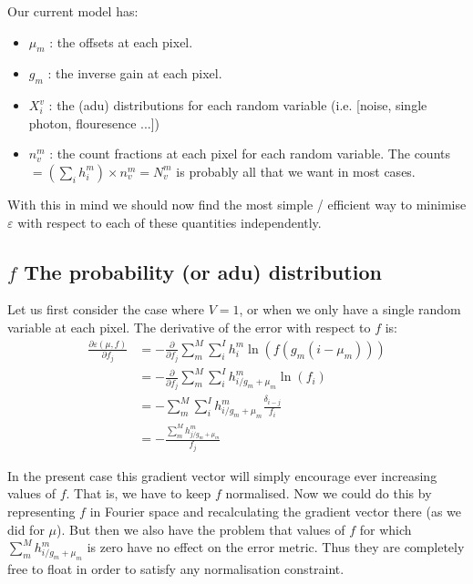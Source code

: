 \documentclass[11pt]{article}
\begin{document}
Our current model has:
\begin{itemize}
  \item $\mu_m$ : the offsets at each pixel.
  \item $g_m$   : the inverse gain at each pixel.
  \item $X^v_i$ : the (adu) distributions for each random variable (i.e. [noise, single photon, flouresence ...])
  \item $n^m_v$ : the count fractions at each pixel for each random variable. The counts $= (\sum_i h^m_i) \times n^m_v = N^m_v$ is probably all that we want in most cases.
\end{itemize}

With this in mind we should now find the most simple / efficient way to minimise $\varepsilon$ with respect to each of these quantities independently. 















\subsection{$f$ The probability (or adu) distribution}
Let us first consider the case where $V=1$, or when we only have a single random variable at each pixel. The derivative of the error with respect to $f$ is:
\begin{align}
   \frac{\partial \varepsilon(\mu, f)}{\partial f_j} &= -\frac{\partial}{\partial f_j} \sum_m^M \sum_i^I h^m_i \ln(f(g_m(i - \mu_m))) \\
   &= -\frac{\partial}{\partial f_j} \sum_m^M \sum_i^I h^m_{i/g_m+\mu_m} \ln(f_i) \\
   &= -\sum_m^M \sum_i^I h^m_{i/g_m+\mu_m} \frac{\delta_{i-j}}{f_i} \\
   &= -\frac{\sum_m^M h^m_{j/g_m+\mu_m}}{f_j}
\end{align}

In the present case this gradient vector will simply encourage ever increasing values of $f$. That is, we have to keep $f$ normalised. Now we could do this by representing $f$ in Fourier space and recalculating the gradient vector there (as we did for $\mu$). But then we also have the problem that values of $f$ for which $\sum_m^M h^m_{i/g_m+\mu_m}$ is zero have no effect on the error metric. Thus they are completely free to float in order to satisfy any normalisation constraint.
\end{document}
